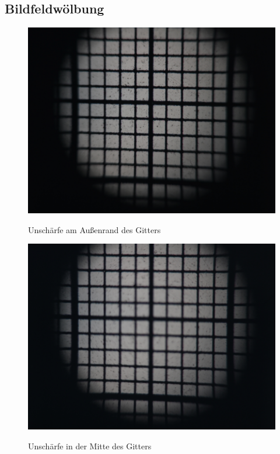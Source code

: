 \subsection{Bildfeldwölbung}

\begin{figure}[htb]
	\begin{minipage}[t]{0.48\textwidth}
		\includegraphics[width=\linewidth]{img/Bildwoelbung/Prakt_Linsenfehler_2015_06_04_074}
		\label{fig:bildwoelbung_aussen}
		\caption{Unschärfe am Außenrand des Gitters}
	\end{minipage}
	\hfill
	\begin{minipage}[t]{0.48\textwidth}
		\includegraphics[width=\linewidth]{img/Bildwoelbung/Prakt_Linsenfehler_2015_06_04_075}
		\label{fig:bildwoelbung_korrigiert}
		\caption{Unschärfe in der Mitte des Gitters}
	\end{minipage}
\end{figure}

